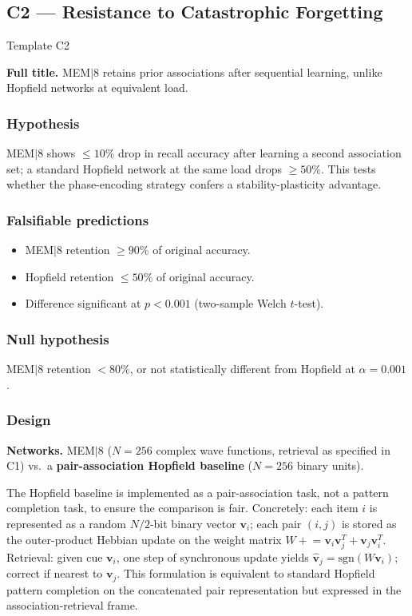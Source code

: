 \documentclass[11pt, a4paper]{article}
\newcommand{\mem}{MEM$|$8}
\begin{document}
\subsection{C2 — Resistance to Catastrophic Forgetting}

\begin{predbox}{Template C2}

\textbf{Full title.}
\mem{} retains prior associations after sequential learning, unlike Hopfield
networks at equivalent load.

\subsubsection{Hypothesis}

\mem{} shows $\leq 10\%$ drop in recall accuracy after learning a second
association set; a standard Hopfield network at the same load drops $\geq 50\%$.
This tests whether the phase-encoding strategy confers a stability-plasticity
advantage.

\subsubsection{Falsifiable predictions}

\begin{itemize}
  \item \mem{} retention $\geq 90\%$ of original accuracy.
  \item Hopfield retention $\leq 50\%$ of original accuracy.
  \item Difference significant at $p < 0.001$ (two-sample Welch $t$-test).
\end{itemize}

\subsubsection{Null hypothesis}

\mem{} retention $< 80\%$, or not statistically different from Hopfield at
$\alpha = 0.001$.

\subsubsection{Design}

\textbf{Networks.}
\mem{} ($N = 256$ complex wave functions, retrieval as specified in C1) vs.\
a \textbf{pair-association Hopfield baseline} ($N = 256$ binary units).

The Hopfield baseline is implemented as a pair-association task, not a pattern
completion task, to ensure the comparison is fair.  Concretely: each item $i$
is represented as a random $N/2$-bit binary vector $\mathbf{v}_i$; each pair
$(i,j)$ is stored as the outer-product Hebbian update on the weight matrix
$W \mathrel{+}= \mathbf{v}_i \mathbf{v}_j^T + \mathbf{v}_j \mathbf{v}_i^T$.
Retrieval: given cue $\mathbf{v}_i$, one step of synchronous update yields
$\hat{\mathbf{v}}_j = \mathrm{sgn}(W \mathbf{v}_i)$; correct if nearest to
$\mathbf{v}_j$.  This formulation is equivalent to standard Hopfield pattern
completion on the concatenated pair representation but expressed in the
association-retrieval frame.


\end{predbox}
\end{document}
